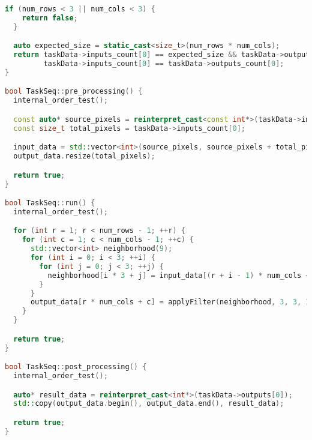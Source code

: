 \documentclass[14pt]{extarticle}
\theoremstyle{definition}
\theoremstyle{remark}
\begin{document}
\begin{lstlisting}[language=C++, caption=Приложение №1]
  if (num_rows < 3 || num_cols < 3) {
    return false;
  }

  auto expected_size = static_cast<size_t>(num_rows * num_cols);
  return taskData->inputs_count[0] == expected_size && taskData->outputs_count[0] == expected_size &&
         taskData->inputs_count[0] == taskData->outputs_count[0];
}

bool TaskSeq::pre_processing() {
  internal_order_test();

  const auto* source_pixels = reinterpret_cast<const int*>(taskData->inputs[0]);
  const size_t total_pixels = taskData->inputs_count[0];

  input_data = std::vector<int>(source_pixels, source_pixels + total_pixels);
  output_data.resize(total_pixels);

  return true;
}

bool TaskSeq::run() {
  internal_order_test();

  for (int r = 1; r < num_rows - 1; ++r) {
    for (int c = 1; c < num_cols - 1; ++c) {
      std::vector<int> neighborhood(9);
      for (int i = 0; i < 3; ++i) {
        for (int j = 0; j < 3; ++j) {
          neighborhood[i * 3 + j] = input_data[(r + i - 1) * num_cols + (c + j - 1)];
        }
      }
      output_data[r * num_cols + c] = applyFilter(neighborhood, 3, 3, 1, 1);
    }
  }

  return true;
}

bool TaskSeq::post_processing() {
  internal_order_test();

  auto* result_data = reinterpret_cast<int*>(taskData->outputs[0]);
  std::copy(output_data.begin(), output_data.end(), result_data);

  return true;
}
\end{lstlisting}
\end{document}
